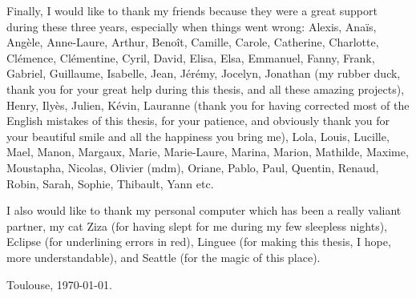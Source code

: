 Finally, I would like to thank my friends because they were a great support during these three years,
especially when things went wrong: 
Alexis, Ana\"is, Ang\`ele, Anne-Laure, Arthur, Beno\^it, Camille, Carole, 
Catherine, Charlotte, Cl\'emence, Cl\'ementine, Cyril, David, Elisa, Elsa, Emmanuel, Fanny,
Frank, Gabriel, Guillaume, Isabelle, Jean, J\'er\'emy, Jocelyn, 
Jonathan (my rubber duck, thank you for your great help during this thesis, and all these amazing projects), 
Henry, Ily\`es, Julien, K\'evin,
Lauranne (thank you for having corrected most of the English mistakes of this thesis, 
for your patience, and obviously thank you for your beautiful smile
and all the happiness you bring me), 
Lola, Louis, Lucille, Mael, Manon, Margaux, Marie, Marie-Laure, Marina, 
Marion, Mathilde, Maxime, Moustapha, Nicolas, Olivier (mdm), Oriane, 
Pablo, Paul, Quentin, Renaud, Robin, Sarah, Sophie, Thibault, Yann etc.

I also would like to thank my personal computer which has been a really valiant partner, 
my cat Ziza (for having slept for me during my few sleepless nights),
Eclipse (for underlining errors in red), 
Linguee (for making this thesis, I hope, more understandable),
and Seattle (for the magic of this place).


\vspace{2cm}

\hfill Toulouse, \today.
